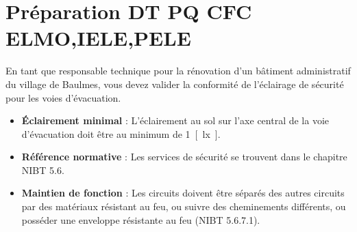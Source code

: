 \documentclass[a4paper,11pt,answers,addpoints]{exam}
\begin{document}
	\unframedsolutions
	\pointsinmargin
	\bracketedpoints
	
\section*{Préparation DT PQ CFC ELMO,IELE,PELE}
\begin{questions}
\question
En tant que responsable technique pour la rénovation d'un bâtiment administratif du village de Baulmes, vous devez valider la conformité de l'éclairage de sécurité pour les voies d'évacuation. 


\begin{solution}
	\begin{itemize}
		\item \textbf{Éclairement minimal} : L'éclairement au sol sur l'axe central de la voie d'évacuation doit être au minimum de \qty{1}{[\lux]}.
		\item \textbf{Référence normative} : Les services de sécurité se trouvent dans le chapitre NIBT \num{5.6}.
		\item \textbf{Maintien de fonction} : Les circuits doivent être séparés des autres circuits par des matériaux résistant au feu, ou suivre des cheminements différents, ou posséder une enveloppe résistante au feu (NIBT 5.6.7.1).
	\end{itemize}
	

	\end{solution}
\end{questions}
\end{document}
